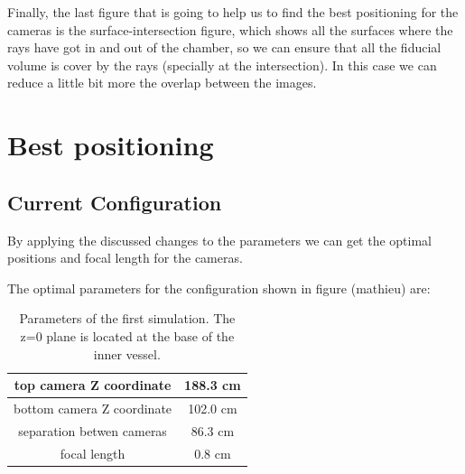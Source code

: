\documentclass{article}
\begin{document}
Finally, the last figure that is going to help us to find the best positioning for the cameras is the surface-intersection figure, which shows all the surfaces where the rays have got in and out of the chamber, so we can ensure that all the fiducial volume is cover by the rays (specially at the intersection). In this case we can reduce a little bit more the overlap between the images.



\section{Best positioning}

\subsection*{Current Configuration}
By applying the discussed changes to the parameters we can get the optimal positions and focal length for the cameras.

The optimal parameters for the configuration shown in figure (mathieu) are:

\begin{table}[]
    \centering
    \begin{tabular}{|c|c|}
        \hline
        top camera Z coordinate &  188.3 cm\\
        \hline
        bottom camera Z coordinate & 102.0 cm\\
        \hline
        separation betwen cameras & 86.3 cm\\
        \hline
        focal length & 0.8 cm\\
        \hline
        
    \end{tabular}
    \caption{Parameters of the first simulation. The z=0 plane is located at the base of the inner vessel.}
    \label{tab:my_label}
\end{table}
\end{document}
